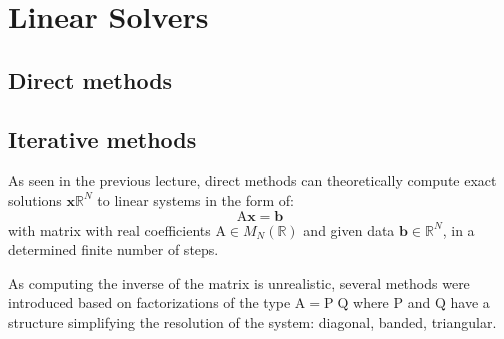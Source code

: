 
\newcommand{\xC}{\mathbb{C}}
\newcommand{\xR}{\mathbb{R}}
\newcommand{\xRd}{{\xR^d}}
\newcommand{\xRN}{{\xR^N}}
\newcommand{\xMNR}{{M_N(\xR)}}
\newcommand{\bb}{{\boldsymbol b}}
\newcommand{\ee}{{\boldsymbol e}}
\newcommand{\ev}{{\boldsymbol \epsilon}}
\newcommand{\rr}{{\boldsymbol r}}
\newcommand{\xx}{{\boldsymbol x}}
\newcommand{\hx}{\hat{\boldsymbol x}}
\newcommand{\yy}{{\boldsymbol y}}
\newcommand{\ww}{{\boldsymbol w}}
\newcommand{\zz}{{\boldsymbol z}}
\newcommand{\mA}{{\mathrm A}}
\newcommand{\mB}{{\mathrm B}}
\newcommand{\mC}{{\mathrm C}}
\newcommand{\mD}{{\mathrm D}}
\newcommand{\mG}{{\mathrm G}}
\newcommand{\mH}{{\mathrm H}}
\newcommand{\mJ}{{\mathrm J}}
\newcommand{\mL}{{\mathrm L}}
\newcommand{\mLs}{{\mathrm L_0}}
\newcommand{\mM}{{\mathrm M}}
\newcommand{\mRs}{{\mathrm R_0}}
\newcommand{\mR}{{\mathrm R}}
\newcommand{\mP}{{\mathrm P}}
\newcommand{\mQ}{{\mathrm Q}}
\newcommand{\mU}{{\mathrm U}}
\newcommand{\mId}{{\mathbf{Id}}}
\newcommand{\mII}{{\mathbf{\mathbb{I}}}}
\newcommand{\Seq}[1]{\bigl(#1\bigr)}
\newcommand{\Cond}[1]{\mathcal{C}(#1)}
\newcommand{\Order}[1]{\mathcal{O}\left(#1\right)}
\newcommand{\norm}[1]{{\lVert #1 \rVert}}
\newcommand{\norminf}[1]{\norm{#1}_{\infty}}

\newcommand{\InnerK}[2]{{{\mathbf\langle}\;#1\:,\: #2 \;{\rangle}}}
\newcommand{\Inner}[2]{{{\scriptstyle\mathbf{(}}\;#1\:,\: #2 \;{\scriptstyle\mathbf{)}}}}

\newcommand{\argmin}[1]{\mathop{\underset{#1}{\mathrm{argmin}}}\:}

\chapter{Linear Solvers}

\section{Direct methods}

\section{Iterative methods}

As seen in the previous lecture, direct methods can theoretically compute exact solutions $\xx\xRN$ to linear systems in the form of:
\[
\mA \xx = \bb
\]
with matrix with real coefficients $\mA\in\xMNR$ and given data $\bb\in\xRN$, in a determined finite number of steps.

As computing the inverse of the matrix is unrealistic, several methods were introduced based on factorizations of the type $\mA = \mP\;\mQ$ where $\mP$ and $\mQ$ have a structure simplifying the resolution of the system: diagonal, banded, triangular.

